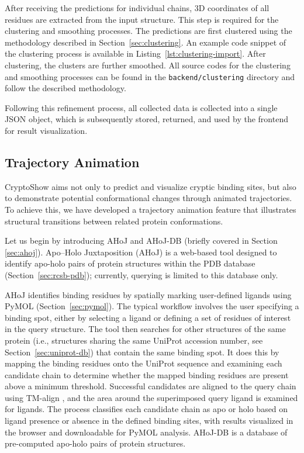 After receiving the predictions for individual chains, 3D coordinates of all residues are extracted from the input structure. This step is required for the clustering and smoothing processes. The predictions are first clustered using the methodology described in Section~\ref{sec:clustering}. An example code snippet of the clustering process is available in Listing~\ref{lst:clustering-import}. After clustering, the clusters are further smoothed. All source codes for the clustering and smoothing processes can be found in the \lstinline!backend/clustering! directory and follow the described methodology.



Following this refinement process, all collected data is collected into a single JSON object, which is subsequently stored, returned, and used by the frontend for result visualization.

\subsection{Trajectory Animation}
\label{sec:trajectory}

CryptoShow aims not only to predict and visualize cryptic binding sites, but also to demonstrate potential conformational changes through animated trajectories. To achieve this, we have developed a trajectory animation feature that illustrates structural transitions between related protein conformations.

Let us begin by introducing AHoJ \cite{feidakis2022ahoj} and AHoJ-DB \cite{feidakis2024ahoj} (briefly covered in Section \ref{sec:ahoj}). Apo–Holo Juxtaposition (AHoJ) is a web-based tool designed to identify apo-holo pairs of protein structures within the PDB database (Section~\ref{sec:rcsb-pdb}); currently, querying is limited to this database only.

AHoJ identifies binding residues by spatially marking user-defined ligands using PyMOL (Section~\ref{sec:pymol}). The typical workflow involves the user specifying a binding spot, either by selecting a ligand or defining a set of residues of interest in the query structure. The tool then searches for other structures of the same protein (i.e., structures sharing the same UniProt accession number, see Section~\ref{sec:uniprot-db}) that contain the same binding spot. It does this by mapping the binding residues onto the UniProt sequence and examining each candidate chain to determine whether the mapped binding residues are present above a minimum threshold. Successful candidates are aligned to the query chain using TM-align \cite{zhang2005tm}, and the area around the superimposed query ligand is examined for ligands. The process classifies each candidate chain as apo or holo based on ligand presence or absence in the defined binding sites, with results visualized in the browser and downloadable for PyMOL analysis. AHoJ-DB is a database of pre-computed apo-holo pairs of protein structures.

